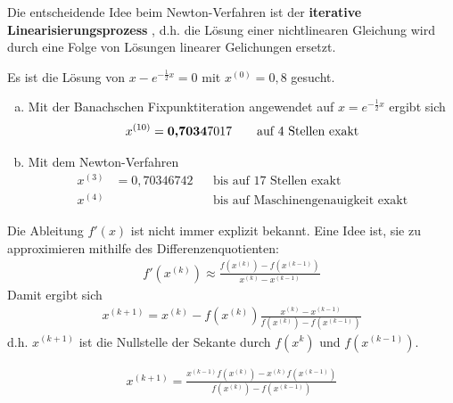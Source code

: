 Die entscheidende Idee beim Newton-Verfahren ist 
der \textbf{iterative Linearisierungsprozess}
, 
d.h. die Lösung einer nichtlinearen Gleichung wird
durch eine Folge von Lösungen linearer Gelichungen ersetzt.

\begin{Bspe}
  \label{5.4.6}
  Es ist die Lösung von $x-e^{-\frac{1}{2}x}=0$ mit $x^{(0)}=0,8$ gesucht.
  \begin{enumerate}[a)]
  \item Mit der Banachschen Fixpunktiteration angewendet auf 
    $x=e^{-\frac{1}{2}x}$ ergibt sich
    \begin{gather*}
      x^{(10)}=\text{\textbf{0,7034}}7017 
      \qquad \text{auf 4 Stellen exakt}
    \end{gather*}
  \item Mit dem Newton-Verfahren
    \begin{align*}
      x^{(3)}&= 0,70346742 &&\text{bis auf 17 Stellen exakt}\\
      x^{(4)} &&& \text{bis auf Maschinengenauigkeit exakt}
    \end{align*}		
  \end{enumerate}
\end{Bspe}
Die Ableitung $f'(x)$ ist nicht immer explizit bekannt.
Eine Idee ist, sie zu approximieren mithilfe des Differenzenquotienten:
\begin{gather*}
  f'(x^{(k)})  \approx \frac{f(x^{(k)})-f(x^{(k-1)})}{x^{(k)}-x^{(k-1)}}
\end{gather*}
Damit ergibt sich
\begin{gather*}
  x^{(k+1)} = x^{(k)}-f(x^{(k)}) \frac{x^{(k)} 
    - x^{(k-1)}}{f(x^{(k)})-f(x^{(k-1)})}
\end{gather*}
d.h. $x^{(k+1)} $ ist die Nullstelle der Sekante 
durch $f(x^{k})$ und $f(x^{(k-1)})$.

\begin{gather}
  x^{(k+1)} = \frac{x^{(k-1)}f(x^{(k)}) 
    - x^{(k)}f(x^{(k-1)})}{f(x^{(k)})-f(x^{(k-1)})}
  \label{V.4.2}
\end{gather}


